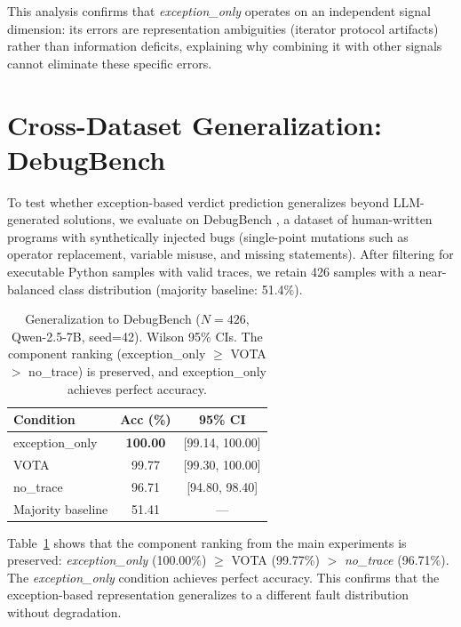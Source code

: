 This analysis confirms that \textit{exception\_only} operates on an independent signal dimension: its errors are representation ambiguities (iterator protocol artifacts) rather than information deficits, explaining why combining it with other signals cannot eliminate these specific errors.


\section{Cross-Dataset Generalization: DebugBench}
\label{sec:debugbench_full}

To test whether exception-based verdict prediction generalizes beyond LLM-generated solutions, we evaluate on DebugBench \citep{tian2024debugbench}, a dataset of human-written programs with synthetically injected bugs (single-point mutations such as operator replacement, variable misuse, and missing statements).
After filtering for executable Python samples with valid traces, we retain 426 samples with a near-balanced class distribution (majority baseline: 51.4\%).

\begin{table}[h!]
\centering
\caption{Generalization to DebugBench ($N{=}426$, Qwen-2.5-7B, seed=42). Wilson 95\% CIs. The component ranking (exception\_only $\geq$ VOTA $>$ no\_trace) is preserved, and exception\_only achieves perfect accuracy.}
\label{tab:debugbench}
\small
\begin{tabular}{lcc}
\toprule
\textbf{Condition} & \textbf{Acc (\%)} & \textbf{95\% CI} \\
\midrule
exception\_only & \textbf{100.00} & [99.14, 100.00] \\
VOTA & 99.77 & [99.30, 100.00] \\
no\_trace & 96.71 & [94.80, 98.40] \\
\midrule
Majority baseline & 51.41 & --- \\
\bottomrule
\end{tabular}
\end{table}

Table~\ref{tab:debugbench} shows that the component ranking from the main experiments is preserved: \textit{exception\_only} (100.00\%) $\geq$ VOTA (99.77\%) $>$ \textit{no\_trace} (96.71\%).
The \textit{exception\_only} condition achieves perfect accuracy. This confirms that the exception-based representation generalizes to a different fault distribution without degradation.

